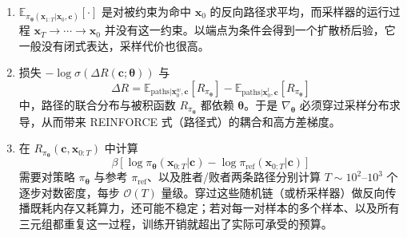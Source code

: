 \begin{enumerate}[leftmargin=*]
\item {}
$\mathbb E_{\pi_{\bm\theta}(\mathbf x_{1:T}|\mathbf x_0,\mathbf c)}[\cdot]$ 是对被约束为命中 $\mathbf x_0$ 的反向路径求平均，而采样器的运行过程 $\mathbf x_T \to \cdots \to \mathbf x_0$ 并没有这一约束。以端点为条件会得到一个扩散桥后验，它一般没有闭式表达，采样代价也很高。

\item {}
损失 $-\log\sigma(\Delta R(\mathbf c;\bm\theta))$ 与
\[
\Delta R=\mathbb E_{\text{paths}|\mathbf x_0^w,\mathbf c}[R_{\pi_{\bm\theta}}]
-\mathbb E_{\text{paths}|\mathbf x_0^l,\mathbf c}[R_{\pi_{\bm\theta}}]
\]
中，路径的联合分布与被积函数 $R_{\pi_{\bm\theta}}$ 都依赖 $\bm\theta$。于是 $\nabla_{\bm\theta}$ 必须穿过采样分布求导，从而带来 REINFORCE 式（路径式）的耦合和高方差梯度。

\item {}
在 $R_{\pi_{\bm\theta}}(\mathbf c,\mathbf x_{0:T})$ 中计算
\[
\beta \left[\log \pi_{\bm\theta}(\mathbf x_{0:T}|\mathbf c)
-\log \pi_{\mathrm{ref}}(\mathbf x_{0:T}|\mathbf c)\right]
\]
需要对策略 $\pi_{\bm\theta}$ 与参考 $\pi_{\mathrm{ref}}$、以及胜者/败者两条路径分别计算 $T \sim 10^2$–$10^3$ 个逐步对数密度，每步 $\mathcal O(T)$ 量级。穿过这些随机链（或桥采样器）做反向传播既耗内存又耗算力，还可能不稳定；若对每一对样本的多个样本、以及所有三元组都重复这一过程，训练开销就超出了实际可承受的预算。
\end{enumerate}

